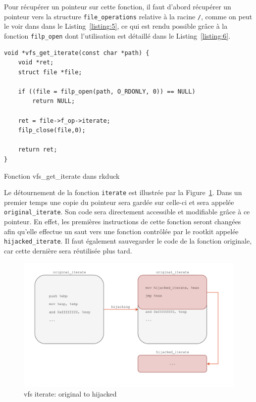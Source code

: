 \documentclass[12pt]{article}
\begin{document}
        Pour récupérer un pointeur sur cette fonction, il faut d'abord récupérer un pointeur vers la structure \texttt{file\_operations} relative à la racine \texttt{/}, comme on peut le voir dans dans le Listing~\ref{listing:5}, ce qui est rendu possible grâce à la fonction \texttt{filp\_open} dont l'utilisation est détaillé dans le Listing~\ref{listing:6}.\\

\begin{listing}[H]
\begin{verbatim}
void *vfs_get_iterate(const char *path) {
    void *ret;
    struct file *file;

    if ((file = filp_open(path, O_RDONLY, 0)) == NULL)
        return NULL;

    ret = file->f_op->iterate;
    filp_close(file,0);

    return ret;
}
\end{verbatim}
\caption{Fonction vfs\_get\_iterate dans rkduck}
\label{listing:6}
\end{listing}

        Le détournement de la fonction \texttt{iterate} est illustrée par la Figure~\ref{figure:1}. Dans un premier temps une copie du pointeur sera gardée sur celle-ci et sera appelée \texttt{original\_iterate}. Son code sera directement accessible et modifiable grâce à ce pointeur. En effet, les premières instructions de cette fonction seront changées afin qu'elle effectue un saut vers une fonction contrôlée par le rootkit appelée \texttt{hijacked\_iterate}. Il faut également sauvegarder le code de la fonction originale, car cette dernière sera réutilisée plus tard. \\

\begin{figure}[H] 
\begin{center}
\includegraphics[scale=0.4]{./img/vfs_iterate_original_to_hijacked.png}

\caption[dsfsdf]{vfs iterate: original to hijacked}
\label{figure:1}
\end{center}
\end{figure}
\end{document}

